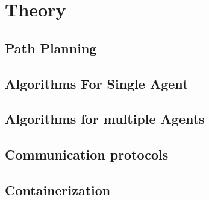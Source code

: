 \chapter{Theory}

\section{Path Planning}


\section{Algorithms For Single Agent}


\section{Algorithms for multiple Agents}


\section{Communication protocols}


\section{Containerization}
